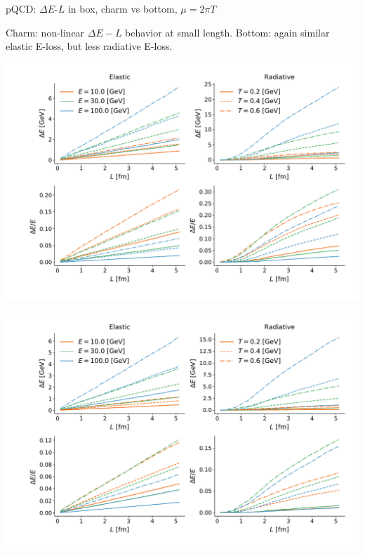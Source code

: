 \documentclass[11pt]{beamer}
\begin{document}
\begin{frame}{pQCD: $\Delta E$-$L$ in box, charm vs bottom, $\mu = 2\pi T$}
\begin{overprint}
Charm: non-linear $\Delta E-L$ behavior at small length.
Bottom: again similar elastic E-loss, but less radiative E-loss.
\end{overprint}

\begin{overprint}
\begin{center}
\includegraphics[width=\textwidth]{fig/charm-plot/L_Eloss.pdf}
\end{center}
\begin{center}
\includegraphics[width=\textwidth]{fig/bottom-plot/L_Eloss.pdf}
\end{center}
\end{overprint}
\end{frame}
\end{document}

